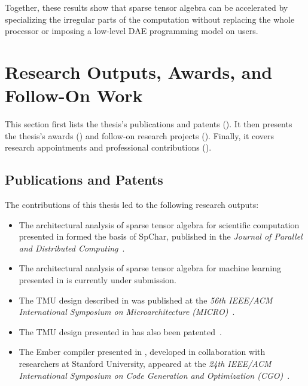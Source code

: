 Together, these results show that sparse tensor algebra can be accelerated by specializing the irregular parts of the computation without replacing the whole processor or imposing a low-level DAE programming model on users.

\section{Research Outputs, Awards, and Follow-On Work} \label{sec:research-outputs-awards-follow-on-work}

This section first lists the thesis's publications and patents (). It then presents the thesis's awards () and follow-on research projects (). Finally, it covers research appointments and professional contributions ().

\subsection{Publications and Patents} \label{sec:publications-and-patents}

The contributions of this thesis led to the following research outputs:
\begin{itemize}
\item The architectural analysis of sparse tensor algebra for scientific computation presented in  formed the basis of SpChar, published in the \textit{Journal of Parallel and Distributed Computing}~\cite{sgherzi2024jpdc}.
\item The architectural analysis of sparse tensor algebra for machine learning presented in  is currently under submission.
\item The TMU design described in  was published at the \textit{56th IEEE/ACM International Symposium on Microarchitecture (MICRO)}~\cite{siracusa2023micro}.
\item The TMU design presented in  has also been patented~\cite{siracusa2025patent}.
\item The Ember compiler presented in , developed in collaboration with researchers at Stanford University, appeared at the \textit{24th IEEE/ACM International Symposium on Code Generation and Optimization (CGO)}~\cite{siracusa2026cgo}.
\end{itemize}

